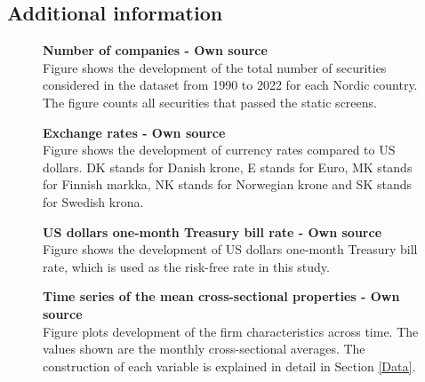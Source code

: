 \documentclass[12pt]{article}
\begin{document}
\begin{appendices}
\clearpage

\section{Additional information}
\renewcommand{\thefigure}{C.\arabic{figure}}
\setcounter{figure}{0}
\renewcommand{\thetable}{C.\arabic{table}}
\setcounter{table}{0}

\begin{figure}[H]
\centering
\caption[Number of companies]{\textbf{Number of companies \textnormal{- Own source}}\\ Figure shows the development of the total number of securities considered in the dataset from 1990 to 2022 for each Nordic country. The figure counts all securities that passed the static screens.}

\label{plot:number_of_companies}
\end{figure}

\begin{figure}[H]
\centering
\caption[Exchange rates]{\textbf{Exchange rates \textnormal{- Own source}}\\ Figure shows the development of currency rates compared to US dollars. DK stands for  Danish krone, E stands for Euro, MK stands for Finnish markka, NK stands for Norwegian krone and SK stands for Swedish krona.}

\label{plot:fx_rates}
\end{figure}

\begin{figure}[H]
\centering
\caption[US dollar one-month Treasury bill rate]{\textbf{US dollars one-month Treasury bill rate \textnormal{- Own source}}\\ Figure shows the development of US dollars one-month Treasury bill rate, which is used as the risk-free rate in this study.}

\label{plot:rf_ts}
\end{figure}

\begin{figure}[H]
\centering
\caption[Time series of the mean cross-sectional properties]{\textbf{Time series of the mean cross-sectional properties \textnormal{- Own source}}\\ Figure plots development of the firm characteristics across time. The values shown are the monthly cross-sectional averages. The construction of each variable is explained in detail in Section \ref{Data}.}

\label{plot:variableTS}
\end{figure}


\end{appendices}
\end{document}

